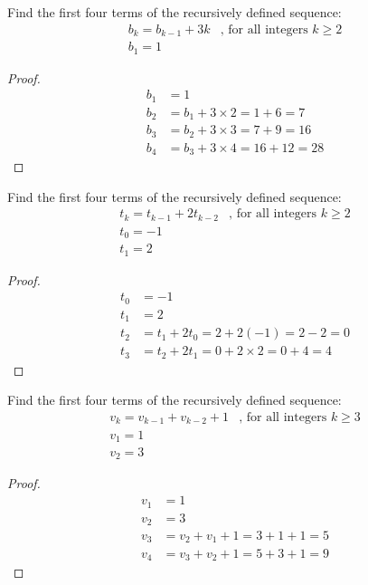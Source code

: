 \documentclass[name=Ojas\ Chaturvedi, emailid=oj.chaturvedi.2024, course=Capstone:\ Discrete\ Math, num=9, deadline={November\ 17,\ 2023}]{homework}
\begin{document}
    Find the first four terms of the recursively defined sequence:
    \begin{align*}
        b_k = b_{k-1} + 3k & \text{, for all integers } k \geq 2 \\
        b_1 = 1
    \end{align*}
\begin{proof}
    \begin{align*}
        b_1 &= 1 \\
        b_2 &= b_{1} + 3 \times 2 = 1 + 6 = 7 \\
        b_3 &= b_{2} + 3 \times 3 = 7 + 9 = 16 \\
        b_4 &= b_{3} + 3 \times 4 = 16 + 12 = 28
    \end{align*}
\end{proof}

    Find the first four terms of the recursively defined sequence:
    \begin{align*}
        t_k = t_{k-1} + 2t_{k-2} & \text{, for all integers } k \geq 2 \\
        t_0 = -1 \\
        t_1 = 2
    \end{align*}
\begin{proof}
    \begin{align*}
        t_0 &= -1 \\
        t_1 &= 2 \\
        t_2 &= t_{1} + 2t_{0} = 2 + 2(-1) = 2 - 2 = 0 \\
        t_3 &= t_{2} + 2t_{1} = 0 + 2 \times 2 = 0 + 4 = 4
    \end{align*}
\end{proof}

    Find the first four terms of the recursively defined sequence:
    \begin{align*}
        v_k = v_{k-1} + v_{k-2} + 1 & \text{, for all integers } k \geq 3 \\
        v_1 = 1 \\
        v_2 = 3
    \end{align*}
\begin{proof}
    \begin{align*}
        v_1 &= 1 \\
        v_2 &= 3 \\
        v_3 &= v_{2} + v_{1} + 1 = 3 + 1 + 1 = 5 \\
        v_4 &= v_{3} + v_{2} + 1 = 5 + 3 + 1 = 9
    \end{align*}
\end{proof}
\end{document}

